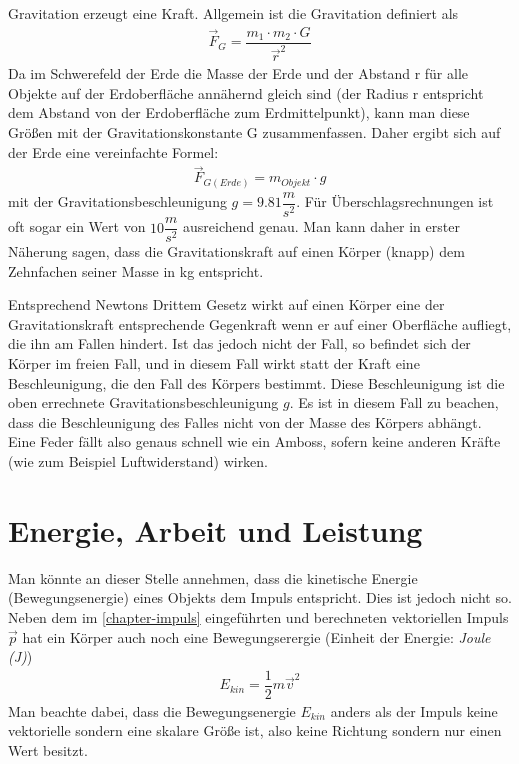 \begin{mdframed}[backgroundcolor=SRH_Warm_Grey!50,skipabove=3em,skipbelow=1em,frametitle=Exkurs: Gravitatonskraft und Gravitationsbeschleunigung] 
Gravitation erzeugt eine Kraft. Allgemein ist die Gravitation definiert als
\begin{eqnarray}
\vec{F}_{G}=\dfrac{m_1 \cdot m_2 \cdot G}{\vec{r}^2}
\end{eqnarray}
Da im Schwerefeld der Erde die Masse der Erde und der Abstand r für alle Objekte auf der Erdoberfläche annähernd gleich sind (der Radius r entspricht dem Abstand von der Erdoberfläche zum Erdmittelpunkt), kann man diese Größen mit der Gravitationskonstante G zusammenfassen. Daher ergibt sich auf der Erde eine vereinfachte Formel:
\begin{eqnarray}
\vec{F}_{G(Erde)}=m_{Objekt} \cdot g
\end{eqnarray}
mit der Gravitationsbeschleunigung $g=9.81\dfrac{m}{s^2}$. Für Überschlagsrechnungen ist oft sogar ein Wert von $10\dfrac{m}{s^2}$ ausreichend genau. Man kann daher in erster Näherung sagen, dass die Gravitationskraft auf einen Körper (knapp) dem Zehnfachen seiner Masse in kg entspricht.

Entsprechend Newtons Drittem Gesetz wirkt auf einen Körper eine der Gravitationskraft entsprechende Gegenkraft wenn er auf einer Oberfläche aufliegt, die ihn am Fallen hindert. Ist das jedoch nicht der Fall, so befindet sich der Körper im freien Fall, und in diesem Fall wirkt statt der Kraft eine Beschleunigung, die den Fall des Körpers bestimmt. Diese Beschleunigung ist die oben errechnete Gravitationsbeschleunigung $g$. Es ist in diesem Fall zu beachen, dass die Beschleunigung des Falles nicht von der Masse des Körpers abhängt. Eine Feder fällt also genaus schnell wie ein Amboss, sofern keine anderen Kräfte (wie zum Beispiel Luftwiderstand) wirken.

\end{mdframed}

\section{Energie, Arbeit und Leistung}

Man könnte an dieser Stelle annehmen, dass die kinetische Energie (Bewegungsenergie) eines Objekts dem Impuls entspricht. Dies ist jedoch nicht so. Neben dem im \ref{chapter-impuls} eingeführten und berechneten vektoriellen Impuls $\vec{p}$ hat ein Körper auch noch eine Bewegungserergie (Einheit der Energie: \textit{Joule (J)})
\begin{eqnarray}
E_{kin}=\dfrac{1}{2}m\vec{v}^2
\end{eqnarray}
Man beachte dabei, dass die Bewegungsenergie $E_{kin}$ anders als der Impuls keine vektorielle sondern eine skalare Größe ist, also keine Richtung sondern nur einen Wert besitzt.

